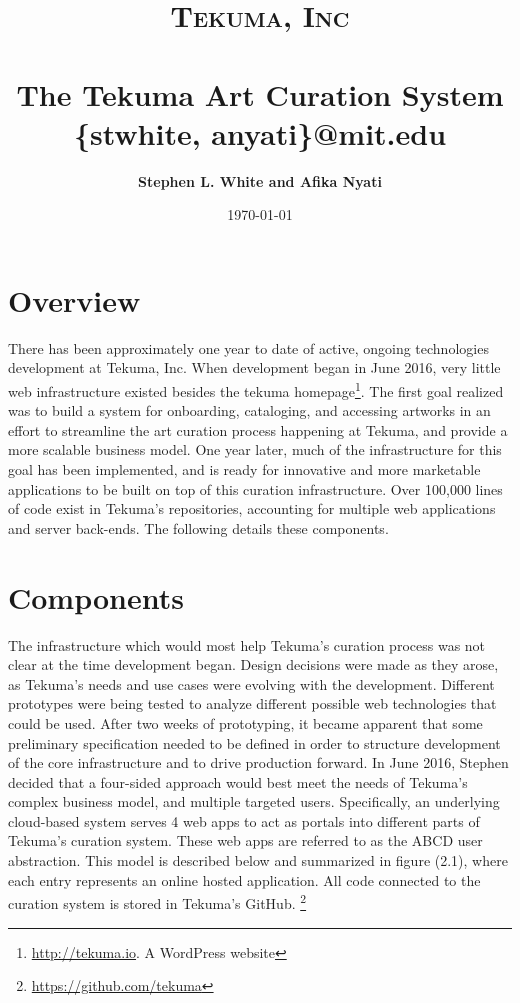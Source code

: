 \documentclass[fontsize=12pt]{scrartcl} %
\title{
\normalfont \normalsize
\textsc{Tekuma, Inc} \\[6pt]
\horrule{0.2pt} \\[10pt] %
\Huge The Tekuma Art Curation System  %
\horrule{1.5pt}  %
\normalsize \{stwhite, anyati\}@mit.edu
}
\author{\textbf{Stephen L. White and Afika Nyati}}
\date{\normalsize \today} %
\begin{document}
\maketitle %

\section{Overview}
There has been approximately one year to date of active, ongoing technologies development at Tekuma, Inc. When development began in June 2016, very little web infrastructure existed besides the tekuma homepage\footnote{\url{http://tekuma.io}. A WordPress website}. The first goal realized was to build a system for onboarding, cataloging, and accessing artworks in an effort to streamline the art curation process happening at Tekuma, and provide a more scalable business model. One year later, much of the infrastructure for this goal has been implemented, and is ready for innovative and more marketable applications to be built on top of this curation infrastructure. Over 100,000 lines of code exist in Tekuma's repositories, accounting for multiple web applications and server back-ends. The following details these components.

\section{Components}
The infrastructure which would most help Tekuma's curation process was not clear at the time development began. Design decisions were made as they arose, as Tekuma's needs and use cases were evolving with the development. Different prototypes were being tested to analyze different possible web technologies that could be used. After two weeks of prototyping, it became apparent that some preliminary specification needed to be defined in order to structure development of the core infrastructure and to drive production forward. In June 2016, Stephen decided that a four-sided approach would best meet the needs of Tekuma's complex business model, and multiple targeted users. Specifically, an underlying cloud-based system serves 4 web apps to act as portals into different parts of Tekuma's curation system. These web apps are referred to as the ABCD user abstraction. This model is described below and summarized in figure (2.1), where each entry represents an online hosted application. All code connected to the curation system is stored in Tekuma's GitHub. \footnote{\url{https://github.com/tekuma}}
\end{document}
